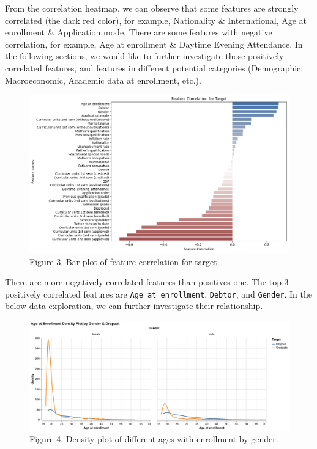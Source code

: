 \documentclass[
]{article}
\begin{document}
From the correlation heatmap, we can observe that some features are
strongly correlated (the dark red color), for example, Nationality \&
International, Age at enrollment \& Application mode. There are some
features with negative correlation, for example, Age at enrollment \&
Daytime Evening Attendance. In the following sections, we would like to
further investigate those positively correlated features, and features
in different potential categories (Demographic, Macroeconomic, Academic
data at enrollment, etc.).

\begin{figure}
\includegraphics[width=1\linewidth]{../results/correlation_with_target_plot} \caption{Figure 3. Bar plot of feature correlation for target.}\label{fig:correlation_with_target_plot}
\end{figure}

There are more negatively correlated features than positives one. The
top 3 positively correlated features are \texttt{Age\ at\ enrollment},
\texttt{Debtor}, and \texttt{Gender}. In the below data exploration, we
can further investigate their relationship.

\begin{figure}
\includegraphics[width=1\linewidth]{../results/gender_density_plot} \caption{Figure 4. Density plot of different ages with enrollment by gender.}\label{fig:gender_density_plot}
\end{figure}
\end{document}
